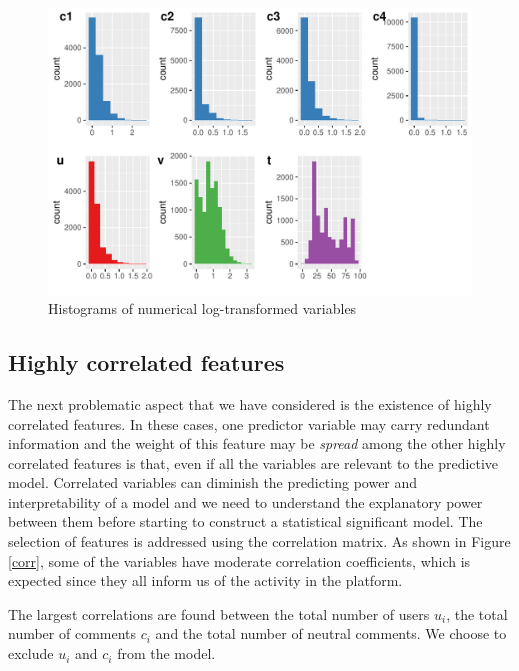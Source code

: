 \begin{figure}[h]
\centering
\includegraphics[width=\textwidth]{Figures/numerical_features.pdf}
\caption{Histograms of numerical log-transformed variables}
\label{hists}
\end{figure}

\subsection{Highly correlated features}\label{sec:corr}

The next problematic aspect that we have considered is the existence of highly correlated features. In these cases, one predictor variable may carry redundant information and the weight of this feature may be \emph{spread} among the other highly correlated features is that, even if all the variables are relevant to the predictive model. Correlated variables can diminish the predicting power and interpretability of a model and we need to understand the explanatory power between them before starting to construct a statistical significant model. The selection of features is addressed using the correlation matrix. As shown in Figure \ref{corr}, some of the variables have moderate correlation coefficients, which is expected since they all inform us of the activity in the platform.

The largest correlations are found between the total number of users $u_i$, the total number of comments $c_i$ and the total number of neutral comments. We choose to exclude $u_i$ and $c_i$ from the model. 

